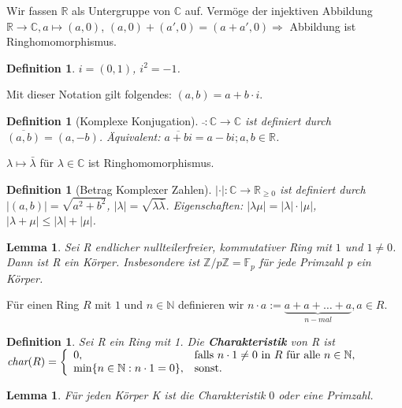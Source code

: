 \documentclass[12pt,a4paper]{article}
\theoremstyle{plain}
\newtheorem{Lemma}[Theorem]{Lemma}
\newtheorem{Definition}[Theorem]{Definition}
\newcommand{\herv}[1]{{\emph{\textbf{#1}}}}
\newcommand{\N}{\mathbb{N}}
\newcommand{\R}{\mathbb{R}}
\newcommand{\Z}{\mathbb{Z}}
\newcommand{\C}{\mathbb{C}}
\numberwithin{equation}{section}
\begin{document}
Wir fassen $\R$ als Untergruppe von $\C$ auf. Vermöge der injektiven Abbildung $\R\rightarrow \C, a\mapsto (a,0)$, $(a,0)+(a',0)=(a+a',0) \Rightarrow$ Abbildung ist Ringhomomorphismus.
\begin{Definition}
$i=(0,1)$, $i^2=-1$.
\end{Definition}
Mit dieser Notation gilt folgendes: $(a,b)=a+b\cdot i$.
\begin{Definition}[Komplexe Konjugation]
$\bar{ }:\C\rightarrow \C$ ist definiert durch $\overline{(a,b)}=(a,-b)$. Äquivalent: $\overline{a+b i}=a-b i; a,b\in \R$.
\end{Definition}
$\lambda \mapsto \bar{\lambda}$ für $\lambda\in\C$ ist Ringhomomorphismus.
\begin{Definition}[Betrag Komplexer Zahlen]
$|\cdot |:\C\rightarrow \R_{\geq 0}$ ist definiert durch $|(a,b)|=\sqrt{a^2+b^2}$, $|\lambda|=\sqrt{\lambda\bar{\lambda}}$. Eigenschaften: $|\lambda\mu|=|\lambda|\cdot |\mu|$, $|\lambda + \mu|\leq |\lambda|+|\mu|$.
\end{Definition}
\begin{Lemma}
Sei R endlicher nullteilerfreier, kommutativer Ring mit $1$ und $1\neq 0$. Dann ist R ein Körper. Insbesondere ist $\Z/p\Z=\mathbb{F}_p$ für jede Primzahl p ein Körper.
\end{Lemma}
Für einen Ring $R$ mit $1$ und $n\in\N$ definieren wir $n\cdot a:=\underbrace{a+a+\ldots+a}_{n-mal}, a\in R$.
\begin{Definition}
Sei R ein Ring mit 1. Die \herv{Charakteristik} von R ist \\$\emph{char}(R)=\left\lbrace\begin{array}{ll}0,&\text{falls }n\cdot 1\neq 0\text{ in }R\text{ für alle }n\in\N,\\
\min\{n\in\N:n\cdot 1=0\},&\text{sonst.}
\end{array}\right.$
\end{Definition}
\begin{Lemma}
Für jeden Körper K ist die Charakteristik $0$ oder eine Primzahl.
\end{Lemma}
\end{document}
